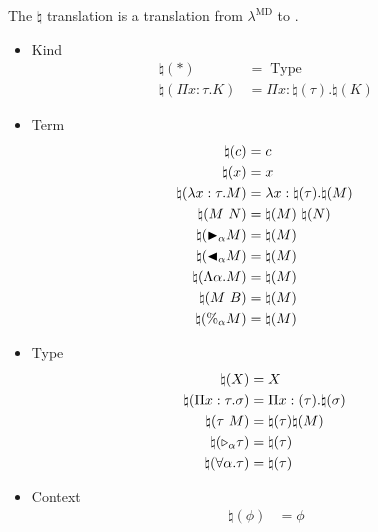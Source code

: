 \begin{dfn}
The $\natural$ translation is a translation from $\lambda^\text{MD}$ to .
    \begin{multicols}{2}
        \begin{itemize}
            \item Kind
                \begin{align*}
                    \natural(*) &= \operatorname{Type} & \\
                    \natural(\Pi x:\tau.K) &= \Pi x:\natural(\tau).\natural(K) &
                \end{align*}
            \item Term
                \begin{align*}
                    \natural(c) &= c & \\
                    \natural(x) &= x & \\
                    \natural(\lambda x:\tau.M) &= \lambda x:\natural(\tau).\natural(M) & \\
                    \natural(M\ N) &= \natural(M)\ \natural(N)& \\
                    \natural({\mathop{\blacktriangleright}}_\alpha M) &= \natural(M) & \\
                    \natural({\mathop{\blacktriangleleft}}_\alpha M) &= \natural(M)& \\
                    \natural(\Lambda\alpha.M) &= \natural(M)& \\
                    \natural(M\ B) &= \natural(M) & \\
                    \natural(\%_\alpha M) &= \natural(M) &
                \end{align*}
            \item Type
            \begin{align*}
                \natural(X) &= X & \\
                \natural(\Pi x:\tau.\sigma) &= \Pi x:(\tau). \natural(\sigma) & \\
                \natural(\tau\ M) &= \natural(\tau) \natural(M) & \\
                \natural({\mathop{\triangleright}}_\alpha \tau) &= \natural(\tau) & \\
                \natural(\forall \alpha.\tau) &= \natural(\tau) &
            \end{align*}
        \item Context
            \begin{align*}
                \natural(\phi) &= \phi & \\

\end{align*}
\end{itemize}
\end{multicols}
\end{dfn}
